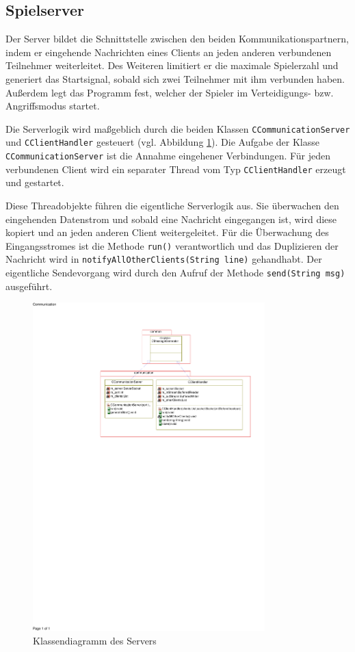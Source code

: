 \subsection{Spielserver}
\label{sec:Spielserver}

Der Server bildet die Schnittstelle zwischen den beiden Kommunikationspartnern, indem er eingehende Nachrichten eines Clients an jeden anderen verbundenen Teilnehmer weiterleitet.
Des Weiteren limitiert er die maximale Spielerzahl und generiert das Startsignal, sobald sich zwei Teilnehmer mit ihm verbunden haben.
Außerdem legt das Programm fest, welcher der Spieler im Verteidigungs- bzw. Angriffsmodus startet.

Die Serverlogik wird maßgeblich durch die beiden Klassen \texttt{CCommunicationServer} und \texttt{CClientHandler} gesteuert (vgl. Abbildung \ref{fig:Serverklassendiagramm}).
Die Aufgabe der Klasse \texttt{CCommunicationServer} ist die Annahme eingehener Verbindungen.
Für jeden verbundenen Client wird ein separater Thread vom Typ \texttt{CClientHandler} erzeugt und gestartet.

Diese Threadobjekte führen die eigentliche Serverlogik aus.
Sie überwachen den eingehenden Datenstrom und sobald eine Nachricht eingegangen ist, wird diese kopiert und an jeden anderen Client weitergeleitet.
Für die Überwachung des Eingangsstromes ist die Methode \texttt{run()} verantwortlich und das Duplizieren der Nachricht wird in \texttt{notifyAllOtherClients(String line)} gehandhabt.
Der eigentliche Sendevorgang wird durch den Aufruf der Methode \texttt{send(String msg)} ausgeführt.

\begin{figure}[H]
  \centering
  \includegraphics[trim=60mm 165mm 10mm 20mm,clip,width=0.8\textwidth]{images/Server.pdf}
  \caption{Klassendiagramm des Servers}
  \label{fig:Serverklassendiagramm}
\end{figure}
